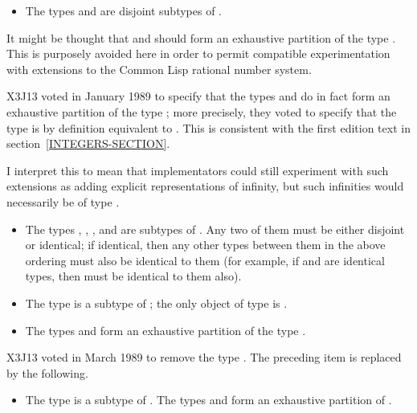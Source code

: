 \begin{itemize}
\item
The types  and  are disjoint subtypes of .
\end{itemize}

\beforenoterule
\begin{rationale}
It might be thought that  and  should
form an exhaustive partition of the type .  This is purposely
avoided here in order to permit compatible experimentation with extensions
to the Common Lisp rational number system.
\end{rationale}
\afternoterule

\begin{new}
X3J13 voted in January 1989
to specify that the types  and 
do in fact form an exhaustive partition of the type ; more precisely,
they voted to specify that the type  is by definition equivalent
to .  This is consistent with the
first edition text in section~\ref{INTEGERS-SECTION}.

I interpret this to mean that implementators could still experiment with
such extensions as adding explicit representations of infinity, but such infinities
would necessarily be of type .
\end{new}

\begin{itemize}
\item
The types , , , and
 are subtypes of .  Any two of them must be
either disjoint or identical; if identical, then any other types between
them in the above ordering must also be identical to them
(for example, if  and  are identical types,
then  must be identical to them also).

\item
The type  is a subtype of ; the only object of type
 is {\nil}.

\item
The types  and  form an exhaustive partition of the type
.
\end{itemize}

\begin{newer}
X3J13 voted in March 1989  to remove the type .
The preceding item is replaced by the following.
\begin{itemize}
\item
The type  is a subtype of .
The types  and 
form an exhaustive partition of .
\end{itemize}
\end{newer}

